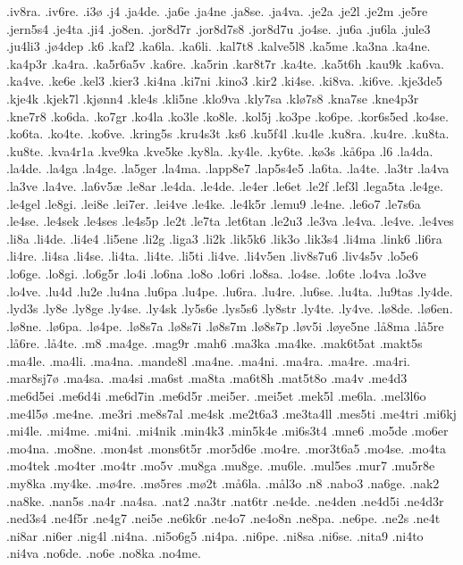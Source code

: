 {.iv8ra.
.iv6re.
.i3ø
.j4
.ja4de.
.ja6e
.ja4ne
.ja8se.
.ja4va.
.je2a
.je2l
.je2m
.je5re
.jern5s4
.je4ta
.ji4
.jo8en.
.jor8d7r
.jor8d7s8
.jor8d7u
.jo4se.
.ju6a
.ju6la
.jule3
.ju4li3
.jø4dep
.k6
.kaf2
.ka6la.
.ka6li.
.kal7t8
.kalve5l8
.ka5me
.ka3na
.ka4ne.
.ka4p3r
.ka4ra.
.ka5r6a5v
.ka6re.
.ka5rin
.kar8t7r
.ka4te.
.ka5t6h
.kau9k
.ka6va.
.ka4ve.
.ke6e
.kel3
.kier3
.ki4na
.ki7ni
.kino3
.kir2
.ki4se.
.ki8va.
.ki6ve.
.kje3de5
.kje4k
.kjek7l
.kjønn4
.kle4s
.kli5ne
.klo9va
.kly7sa
.klø7s8
.kna7se
.kne4p3r
.kne7r8
.ko6da.
.ko7gr
.ko4la
.ko3le
.ko8le.
.kol5j
.ko3pe
.ko6pe.
.kor6s5ed
.ko4se.
.ko6ta.
.ko4te.
.ko6ve.
.kring5s
.kru4s3t
.ks6
.ku5f4l
.ku4le
.ku8ra.
.ku4re.
.ku8ta.
.ku8te.
.kva4r1a
.kve9ka
.kve5ke
.ky8la.
.ky4le.
.ky6te.
.kø3s
.kå6pa
.l6
.la4da.
.la4de.
.la4ga
.la4ge.
.la5ger
.la4ma.
.lapp8e7
.lap5s4e5
.la6ta.
.la4te.
.la3tr
.la4va
.la3ve
.la4ve.
.la6v5æ
.le8ar
.le4da.
.le4de.
.le4er
.le6et
.le2f
.lef3l
.lega5ta
.le4ge.
.le4gel
.le8gi.
.lei8e
.lei7er.
.lei4ve
.le4ke.
.le4k5r
.lemu9
.le4ne.
.le6o7
.le7s6a
.le4se.
.le4sek
.le4ses
.le4s5p
.le2t
.le7ta
.let6tan
.le2u3
.le3va
.le4va.
.le4ve.
.le4ves
.li8a
.li4de.
.li4e4
.li5ene
.li2g
.liga3
.li2k
.lik5k6
.lik3o
.lik3s4
.li4ma
.link6
.li6ra
.li4re.
.li4sa
.li4se.
.li4ta.
.li4te.
.li5ti
.li4ve.
.li4v5en
.liv8s7u6
.liv4s5v
.lo5e6
.lo6ge.
.lo8gi.
.lo6g5r
.lo4i
.lo6na
.lo8o
.lo6ri
.lo8sa.
.lo4se.
.lo6te
.lo4va
.lo3ve
.lo4ve.
.lu4d
.lu2e
.lu4na
.lu6pa
.lu4pe.
.lu6ra.
.lu4re.
.lu6se.
.lu4ta.
.lu9tas
.ly4de.
.lyd3s
.ly8e
.ly8ge
.ly4se.
.ly4sk
.ly5s6e
.lys5s6
.ly8str
.ly4te.
.ly4ve.
.lø8de.
.lø6en.
.lø8ne.
.lø6pa.
.lø4pe.
.lø8s7a
.lø8s7i
.lø8s7m
.lø8s7p
.løv5i
.løye5ne
.lå8ma
.lå5re
.lå6re.
.lå4te.
.m8
.ma4ge.
.mag9r
.mah6
.ma3ka
.ma4ke.
.mak6t5at
.makt5s
.ma4le.
.ma4li.
.ma4na.
.mande8l
.ma4ne.
.ma4ni.
.ma4ra.
.ma4re.
.ma4ri.
.mar8sj7ø
.ma4sa.
.ma4si
.ma6st
.ma8ta
.ma6t8h
.mat5t8o
.ma4v
.me4d3
.me6d5ei
.me6d4i
.me6d7in
.me6d5r
.mei5er.
.mei5et
.mek5l
.me6la.
.mel3l6o
.me4l5ø
.me4ne.
.me3ri
.me8s7al
.me4sk
.me2t6a3
.me3ta4ll
.mes5ti
.me4tri
.mi6kj
.mi4le.
.mi4me.
.mi4ni.
.mi4nik
.min4k3
.min5k4e
.mi6s3t4
.mne6
.mo5de
.mo6er
.mo4na.
.mo8ne.
.mon4st
.mons6t5r
.mor5d6e
.mo4re.
.mor3t6a5
.mo4se.
.mo4ta
.mo4tek
.mo4ter
.mo4tr
.mo5v
.mu8ga
.mu8ge.
.mu6le.
.mul5es
.mur7
.mu5r8e
.my8ka
.my4ke.
.mø4re.
.mø5res
.mø2t
.må6la.
.mål3o
.n8
.nabo3
.na6ge.
.nak2
.na8ke.
.nan5s
.na4r
.na4sa.
.nat2
.na3tr
.nat6tr
.ne4de.
.ne4den
.ne4d5i
.ne4d3r
.ned3s4
.ne4f5r
.ne4g7
.nei5e
.ne6k6r
.ne4o7
.ne4o8n
.ne8pa.
.ne6pe.
.ne2s
.ne4t
.ni8ar
.ni6er
.nig4l
.ni4na.
.ni5o6g5
.ni4pa.
.ni6pe.
.ni8sa
.ni6se.
.nita9
.ni4to
.ni4va
.no6de.
.no6e
.no8ka
.no4me.
}
